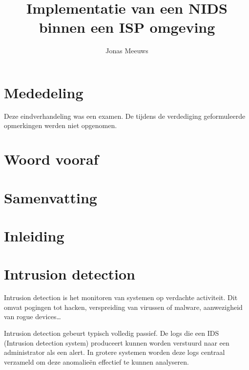 \documentclass[a4paper,12pt]{report}
\title{Implementatie van een NIDS binnen een ISP omgeving}
\author{Jonas Meeuws}
\begin{document}


\newpage
\thispagestyle{empty}
\mbox{}



\chapter*{Mededeling}
Deze eindverhandeling was een examen.
De tijdens de verdediging geformuleerde opmerkingen werden niet opgenomen.

\chapter*{Woord vooraf}
\blindtext

\chapter*{Samenvatting}
\blindtext

\tableofcontents
\newpage

\listoffigures

\chapter*{Inleiding}
\blindtext

\chapter{Intrusion detection}
Intrusion detection is het monitoren van systemen op verdachte activiteit.
Dit omvat pogingen tot hacken, verspreiding van virussen of malware, aanwezigheid van rogue devices\dots

Intrusion detection gebeurt typisch volledig passief.
De logs die een IDS (Intrusion detection system) produceert kunnen worden verstuurd naar een administrator als een alert.
In grotere systemen worden deze logs centraal verzameld om deze anomalieën effectief te kunnen analyseren.
\autocite{wikipedia:ids}
\end{document}
